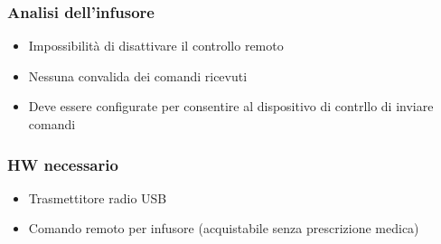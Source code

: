 \documentclass{beamer}
\begin{document}
\begin{frame}
\frametitle{Analisi dell'infusore}
	\begin{itemize}
		\item{Impossibilità di disattivare il controllo remoto}
		\item{Nessuna convalida dei comandi ricevuti}
		\item{Deve essere configurate per consentire al dispositivo di contrllo di inviare comandi}
	\end{itemize}
\end{frame}

\begin{itemize}
\frametitle{HW necessario}
	\begin{itemize}
		\item Trasmettitore radio USB
		\item Comando remoto per infusore (acquistabile senza prescrizione medica)
	\end{itemize}
\end{itemize}
\end{document}
